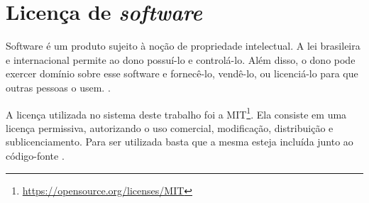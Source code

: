 \section{Licença de \textit{software}}
Software é um produto sujeito à noção de propriedade intelectual. A lei brasileira e internacional permite ao dono possuí-lo e controlá-lo. Além disso, o dono pode exercer domínio sobre esse software e fornecê-lo, vendê-lo, ou licenciá-lo para que outras pessoas o usem. \cite{rosen_2004}.

A licença utilizada no sistema deste trabalho foi a MIT\footnote{\url{https://opensource.org/licenses/MIT}}. Ela consiste em uma licença permissiva, autorizando o uso comercial, modificação, distribuição e sublicenciamento. Para ser utilizada basta que a mesma esteja incluída junto ao código-fonte \cite{mit_license}.